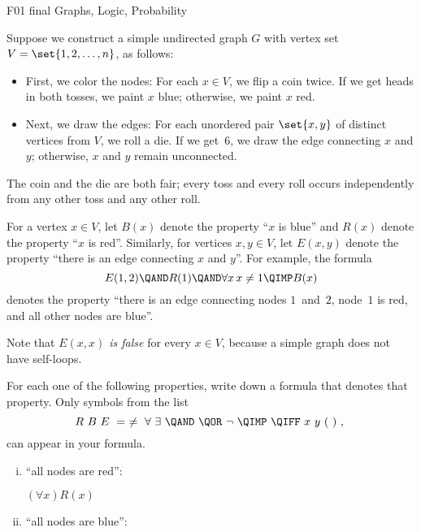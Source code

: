 \begin{problem}
\begin{staffnotes}
F01 final
Graphs, Logic, Probability
\end{staffnotes}

Suppose we construct a simple undirected graph $G$ with vertex set
$V=\set{1,2,\dots,n}$, as follows:

\begin{itemize}
\item
First, we color the nodes: For each $x\in V$, we flip a coin twice. 
If we get heads in both tosses, we paint $x$ blue; otherwise, we paint 
$x$ red. 
\item
Next, we draw the edges: For each unordered pair $\set{x,y}$ of
distinct vertices from $V$, we roll a die. If we get~$6$, we draw
the edge connecting $x$ and $y$; otherwise, $x$ and $y$ remain
unconnected.  
\end{itemize} 

The coin and the die are both fair; every toss and every roll occurs
independently from any other toss and any other roll. 

For a vertex $x\in V$, let $B(x)$ denote the property ``$x$ is blue'' and
$R(x)$ denote the property ``$x$ is red''. Similarly, for vertices $x,y\in
V$, let $E(x,y)$ denote the property ``there is an edge connecting $x$ and
$y$''. For example, the formula
\[
E(1,2) \QAND 
R(1)   \QAND 
\forall x\, x\neq 1 \QIMP B(x)
\]
denotes the property ``there is an edge connecting nodes $1$~and~$2$,
node~$1$ is red, and all other nodes are blue''.

Note that \emph{$E(x,x)$ is false} for every $x \in V$, because a simple
graph does not have self-loops.

\bparts
\ppart
For each one of the following properties, write down a formula that
denotes that property.  Only symbols from the list
\[
R\ B\ E\ 
=\ \neq\ 
\forall\ \exists\ 
\QAND\ \QOR\ \neg\ \QIMP\ \QIFF\
x\ y\ 
(\ )\ ,\
\]
can appear in your formula.

\begin{enumerate}[(i)]


\item \label{item-first} ``all nodes are red'': 

\begin{solution}
$(\forall x)R(x)$
\end{solution}

\item
``all nodes are blue'': 


\end{enumerate}
\end{problem}
